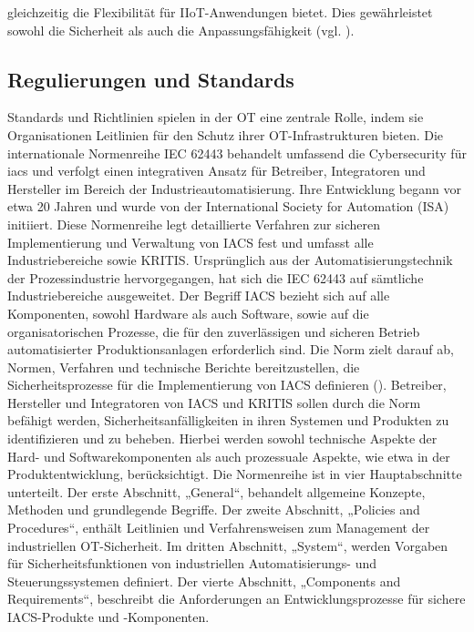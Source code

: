 gleichzeitig die Flexibilität für IIoT-Anwendungen bietet. Dies gewährleistet sowohl die Sicherheit als auch die Anpassungsfähigkeit (vgl. \cite{securityInsider}).



\subsection{Regulierungen und Standards}
Standards und Richtlinien spielen in der OT eine zentrale Rolle, indem sie Organisationen Leitlinien für den Schutz ihrer OT-Infrastrukturen bieten. Die internationale Normenreihe IEC 62443 behandelt umfassend die Cybersecurity für \ac{iacs} und verfolgt einen integrativen Ansatz für Betreiber, Integratoren und Hersteller im Bereich der Industrieautomatisierung. Ihre Entwicklung begann vor etwa 20 Jahren und wurde von der International Society for Automation (ISA) initiiert. Diese Normenreihe legt detaillierte Verfahren zur sicheren Implementierung und Verwaltung von IACS fest und umfasst alle Industriebereiche sowie KRITIS. Ursprünglich aus der Automatisierungstechnik der Prozessindustrie hervorgegangen, hat sich die IEC 62443 auf sämtliche Industriebereiche ausgeweitet. \clearpage \noindent Der Begriff IACS bezieht sich auf alle Komponenten, sowohl Hardware als auch Software, sowie auf die organisatorischen Prozesse, die für den zuverlässigen und sicheren Betrieb automatisierter Produktionsanlagen erforderlich sind. Die Norm zielt darauf ab, Normen, Verfahren und technische Berichte bereitzustellen, die Sicherheitsprozesse für die Implementierung von IACS definieren (\cite{DKE}). Betreiber, Hersteller und Integratoren von IACS und KRITIS sollen durch die Norm befähigt werden, Sicherheitsanfälligkeiten in ihren Systemen und Produkten zu identifizieren und zu beheben. Hierbei werden sowohl technische Aspekte der Hard- und Softwarekomponenten als auch prozessuale Aspekte, wie etwa in der Produktentwicklung, berücksichtigt.
Die Normenreihe ist in vier Hauptabschnitte unterteilt. Der erste Abschnitt, „General“, behandelt allgemeine Konzepte, Methoden und grundlegende Begriffe. Der zweite Abschnitt, „Policies and Procedures“, enthält Leitlinien und Verfahrensweisen zum Management der industriellen OT-Sicherheit. Im dritten Abschnitt, „System“, werden Vorgaben für Sicherheitsfunktionen von industriellen Automatisierungs- und Steuerungssystemen definiert. Der vierte Abschnitt, „Components and Requirements“, beschreibt die Anforderungen an Entwicklungsprozesse für sichere IACS-Produkte und -Komponenten.
